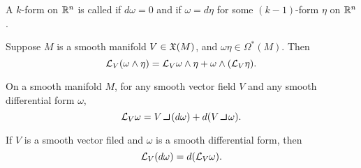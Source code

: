 \dfng A $k$-form on $\mathbb{R}^n$ is called  if $d\omega = 0$ and  if $\omega = d\eta$ for some $(k - 1)$-form $\eta$ on $\mathbb{R}^n$.

\setcounter{thm}{32}

\begin{prop}
Suppose $M$ is a smooth manifold $V\in \mathfrak{X}(M)$, and $\omega\eta\in\Omega^*(M)$. Then 
\[\mathcal{L}_V(\omega\wedge\eta) = \mathcal{L}_V\omega\wedge\eta + \omega\wedge(\mathcal{L}_V\eta).\]
\end{prop}

\setcounter{thm}{34}

\begin{thm}
On a smooth manifold $M$, for any smooth vector field $V$ and any smooth differential form $\omega$,
\[\LL_V\omega = V\hook (d\omega) + d(V\hook \omega).\]
\end{thm}

\begin{cor}
If $V$ is a smooth vector filed and $\omega$ is a smooth differential form, then 
\[\mathcal{L}_V(d\omega) = d(\mathcal{L}_V\omega).\]
\end{cor}
















